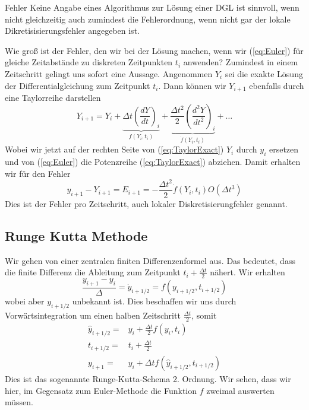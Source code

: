 \begin{note}{Fehler}
  Keine Angabe eines Algorithmus zur Lösung einer DGL ist sinnvoll, wenn nicht
  gleichzeitig auch zumindest die Fehlerordnung, wenn nicht gar der lokale
  Dikretisisierungsfehler angegeben ist.
\end{note}
Wie groß ist der Fehler, den wir bei der Lösung machen, wenn wir
(\ref{eq:Euler}) für gleiche Zeitabstände zu diskreten Zeitpunkten
$t_i$ anwenden? Zumindest in einem Zeitschritt gelingt uns sofort eine Aussage.
Angenommen $Y_i$ sei die exakte Lösung der Differentialgleichung zum Zeitpunkt
$t_i$. Dann können wir $Y_{i+1}$ ebenfalls durch eine Taylorreihe darstellen
\begin{equation}
  Y_{i+1}=Y_{i}
  +\underbrace{\Delta t \left(\frac{dY}{dt}\right)_i}_{f(Y_i,t_i)}
  +\underbrace{\frac{\Delta t^2}{2}\left(\frac{d^2Y}{dt^2}\right)_i}_{\dot{f}(Y_i,t_i)}+\dots
  \label{eq:TaylorExact}
\end{equation}
Wobei wir jetzt auf der rechten Seite von (\ref{eq:TaylorExact}) $Y_i$ durch
$y_i$ ersetzen und von (\ref{eq:Euler}) die Potenzreihe (\ref{eq:TaylorExact})
abziehen. Damit erhalten wir für den Fehler
\begin{equation}
  y_{i+1}-Y_{i+1}=E_{i+1}=-\frac{\Delta t^2}{2}\dot{f}(Y_i,t_i)O(\Delta t^3)
  \label{eq:LokalerFehler}
\end{equation}
Dies ist der Fehler pro Zeitschritt, auch lokaler Diskretisierungfehler genannt.
\subsection{Runge Kutta Methode}
Wir gehen von einer zentralen finiten Differenzenformel aus. Das bedeutet, dass
die finite Differenz die Ableitung zum Zeitpunkt $t_i+\frac{\Delta t}{2}$
nähert. Wir erhalten
\begin{equation}
  \frac{y_{i+1}- y_i}{\Delta}=\dot{y}_{i+1/2}= f(y_{i+1/2},t_{i+1/2})
  \label{eq:Midpoint}
\end{equation}
wobei aber $y_{i+1/2}$ unbekannt ist. Dies beschaffen wir uns durch
Vorwärtsintegration um einen halben Zeitschritt $\frac{\Delta t}{2}$, somit
\begin{align*}
  \hat{y}_{i+1/2}=&y_i+\frac{\Delta t}{2}f(y_{i},t_{i})\\
  t_{i+1/2} =& t_i+\frac{\Delta t}{2}\\
  y_{i+1} =& y_{i}+\Delta t f(\hat{y}_{i+1/2},t_{i+1/2})
\end{align*}
Dies ist das sogenannte Runge-Kutta-Schema 2. Ordnung. Wir sehen, dass wir
hier, im Gegensatz zum Euler-Methode die Funktion $f$ zweimal auswerten müssen.


